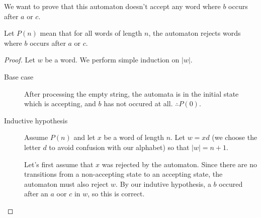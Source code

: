 \documentclass{article}
\begin{document}
\begin{enumerate}

        We want to prove that this automaton doesn't accept any word where $b$ occurs after $a$ or $c$.

        Let $P(n)$ mean that for all words of length $n$, the automaton rejects words where $b$ occurs after $a$ or $c$.

        \begin{proof}
            Let $w$ be a word. We perform simple induction on $|w|$.

            \begin{description}
                \item[Base case] 
                    After processing the empty string, the automata is in the initial state which is accepting, and $b$ has not occured at all. $\therefore P(0)$.

                \item[Inductive hypothesis]
                    Assume $P(n)$ and let $x$ be a word of length $n$. Let $w = xd$ (we choose the letter $d$ to avoid confusion with our alphabet) so that $|w| = n+1$.

                    Let's first assume that $x$ was rejected by the automaton. Since there are no transitions from a non-accepting state to an accepting state, the automaton must also reject $w$. By our indutive hypothesis, a $b$ occured after an $a$ oor $c$ in $w$, so this is correct.


\end{description}
\end{proof}
\end{enumerate}
\end{document}
